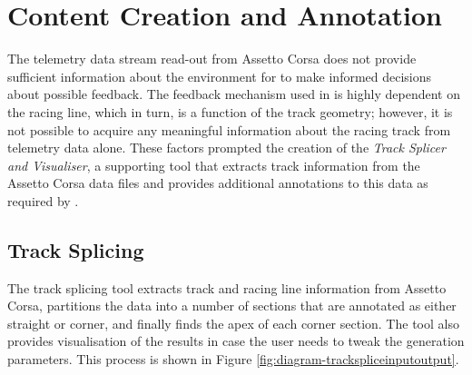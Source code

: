 \section{Content Creation and Annotation}
\label{sec:content-creation}
The telemetry data stream read-out from Assetto Corsa does not provide sufficient information about the environment for \methodname to make informed decisions about possible feedback. The feedback mechanism used in \methodname is highly dependent on the racing line, which in turn, is a function of the track geometry; however, it is not possible to acquire any meaningful information about the racing track from telemetry data alone. These factors prompted the creation of the \emph{Track Splicer and Visualiser}, a supporting tool that extracts track information from the Assetto Corsa data files and provides additional annotations to this data as required by \methodname. 

\subsection{Track Splicing}
\label{sec:imp-trackSplicer}
The track splicing tool extracts track and racing line information from Assetto Corsa, partitions the data into a number of sections that are annotated as either straight or corner, and finally finds the apex of each corner section. The tool also provides visualisation of the results in case the user needs to tweak the generation parameters. This process is shown in Figure \ref{fig:diagram-trackspliceinputoutput}.


